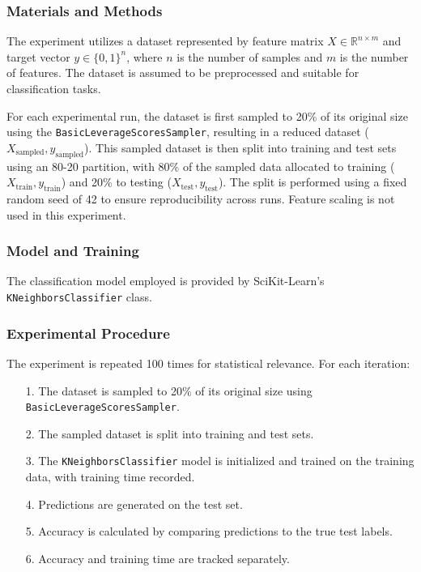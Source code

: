 \documentclass{article}
\theoremstyle{plain}
\theoremstyle{definition}
\theoremstyle{remark}
\begin{document}
\subsubsection{Materials and Methods}

The experiment utilizes a dataset represented by feature matrix $ X \in \mathbb{R}^{n \times m} $ and target vector $ y \in \{0, 1\}^n $, where $ n $ is the number of samples and $ m $ is the number of features. The dataset is assumed to be preprocessed and suitable for classification tasks.

For each experimental run, the dataset is first sampled to 20\% of its original size using the \texttt{BasicLeverageScoresSampler}, resulting in a reduced dataset ($ X_{\text{sampled}}, y_{\text{sampled}} $). This sampled dataset is then split into training and test sets using an 80-20 partition, with 80\% of the sampled data allocated to training ($ X_{\text{train}}, y_{\text{train}} $) and 20\% to testing ($ X_{\text{test}}, y_{\text{test}} $). The split is performed using a fixed random seed of 42 to ensure reproducibility across runs. Feature scaling is not used in this experiment.

\subsubsection{Model and Training}

The classification model employed is provided by SciKit-Learn's \texttt{KNeighborsClassifier} class.

\subsubsection{Experimental Procedure}

The experiment is repeated 100 times for statistical relevance. For each iteration:

\begin{itemize}
	\item [1.] The dataset is sampled to 20\% of its original size using \texttt{BasicLeverageScoresSampler}.
	\item [2.] The sampled dataset is split into training and test sets.
	\item [3.] The \texttt{KNeighborsClassifier} model is initialized and trained on the training data, with training time recorded.
	\item [4.] Predictions are generated on the test set.
	\item [5.] Accuracy is calculated by comparing predictions to the true test labels.
	\item [6.] Accuracy and training time are tracked separately.
\end{itemize}
\end{document}
